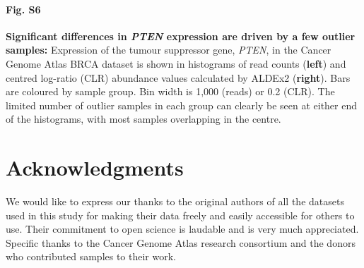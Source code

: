 \documentclass[10pt,letterpaper]{article}
\begin{document}
\paragraph*{Fig. S6}
\label{fig:supFigPTEN}
\textbf{Significant differences in \textit{PTEN} expression are driven by a few outlier samples:} Expression of the tumour suppressor gene, \textit{PTEN}, in the Cancer Genome Atlas BRCA dataset is shown in histograms of read counts (\textbf{left}) and centred log-ratio (CLR) abundance values calculated by ALDEx2 (\textbf{right}). Bars are coloured by sample group. Bin width is 1,000 (reads) or 0.2 (CLR). The limited number of outlier samples in each group can clearly be seen at either end of the histograms, with most samples overlapping in the centre.



\section*{Acknowledgments}
We would like to express our thanks to the original authors of all the datasets used in this study for making their data freely and easily accessible for others to use. Their commitment to open science is laudable and is very much appreciated. Specific thanks to the Cancer Genome Atlas research consortium and the donors who contributed samples to their work.

\nolinenumbers

%
%


\end{document}
